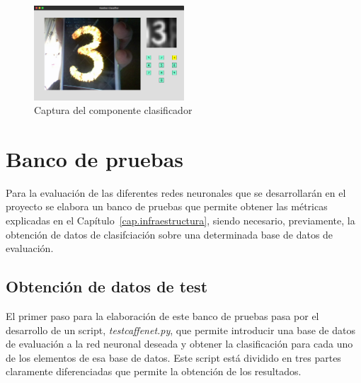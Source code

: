 \begin{figure}[H]
	\begin{center}
		\includegraphics[width=0.5\textwidth]{figures/componente1}
		\caption{Captura del componente clasificador}
		\label{fig.componente1}
	\end{center}
\end{figure}
\vspace{30pt}
\section{Banco de pruebas} \label{sec.banco}
Para la evaluación de las diferentes redes neuronales que se desarrollarán en el proyecto se elabora un banco de pruebas que permite obtener las métricas explicadas en el Capítulo~\ref{cap.infraestructura}, siendo necesario, previamente, la obtención de datos de clasifciación sobre una determinada base de datos de evaluación.\\
\subsection{Obtención de datos de test}
El primer paso para la elaboración de este banco de pruebas pasa por el desarrollo de un script, \textit{testcaffenet.py}, que permite introducir una base de datos de evaluación a la red neuronal deseada y obtener la clasificación para cada uno de los elementos de esa base de datos. Este script está dividido en tres partes claramente diferenciadas que permite la obtención de los resultados.\\

